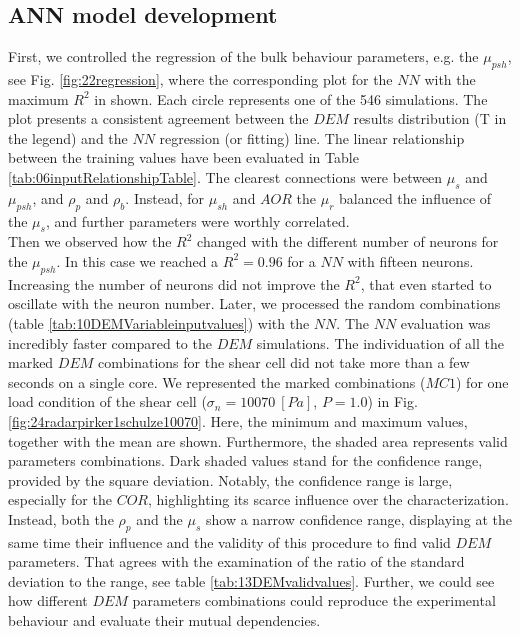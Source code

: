 \subsection{ANN model development}
\label{subsec:annmodeldev}

First, we controlled the regression of the bulk behaviour parameters, e.g. the
$\mu_{psh}$, see Fig. \ref{fig:22regression}, where the corresponding plot for
the $NN$ with the maximum $R^2$ in shown. Each circle represents one of the 546
simulations.
The plot presents a consistent agreement between the $DEM$ results distribution
(T in the legend) and the $NN$ regression (or fitting) line.
The linear relationship between the
training values have been evaluated in Table \ref{tab:06inputRelationshipTable}.
The clearest connections were between $\mu_s$ and $\mu_{psh}$, and
$\rho_p$ and $\rho_b$.
Instead, for $\mu_{sh}$ and $AOR$ the $\mu_r$ balanced the influence of the 
$\mu_s$, and further parameters were worthly correlated. \\
Then we observed how the $R^2$ changed with the different number of neurons for the $\mu_{psh}$. 
In this case we reached a $R^2 = 0.96$ for a $NN$ with fifteen neurons. 
Increasing the number of neurons did not improve the $R^2$, that even started to oscillate with the neuron number. 
Later, we processed the random combinations (table
\ref{tab:10DEMVariableinputvalues}) with the $NN$.
The $NN$ evaluation was incredibly faster compared to the $DEM$ simulations. The
individuation of all the marked $DEM$ combinations for the shear cell did not
take more than a few seconds on a single core.
We represented the marked combinations ($MC1$) for one load condition of the
shear cell ($\sigma_n=10070 ~[Pa]$, $P=1.0$) in Fig.
\ref{fig:24radarpirker1schulze10070}.
Here, the minimum and maximum values, together with the mean are shown. 
Furthermore, the shaded area represents valid parameters combinations.
Dark shaded values stand for the confidence range, provided by the square
deviation.
Notably, the confidence range is large, 
especially for the $COR$, highlighting its scarce influence over the characterization. 
Instead, both the $\rho_p$  and the $\mu_s$ show a narrow confidence range, 
displaying at the same time their influence and the validity of this procedure to find valid $DEM$ parameters. 
That agrees with the examination of the ratio of the standard deviation to the
range, see table \ref{tab:13DEMvalidvalues}.
Further, we could see how different $DEM$ parameters
combinations could reproduce the experimental behaviour and evaluate their mutual dependencies. 
